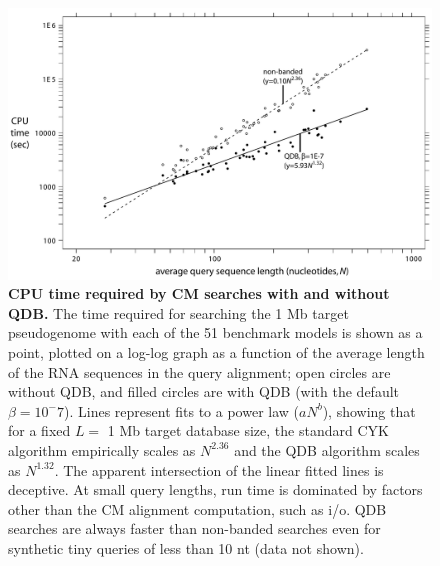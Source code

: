 \begin{figure}
\begin{center}
\includegraphics[width=6.4in]{figs/speedup}
\caption{\textbf{CPU time required by CM searches with and without
    QDB.} The time required for searching the 1 Mb target pseudogenome
    with each of the 51 benchmark models is shown as a point, plotted
    on a log-log graph as a function of the average length of the RNA
    sequences in the query alignment; open circles are without QDB,
    and filled circles are with QDB (with the default $\beta = 
    10^-7$). Lines represent fits to a power law ($aN^b$), showing that
    for a fixed $L=$ 1 Mb target database size, the standard CYK
    algorithm empirically scales as $N^{2.36}$ and the QDB algorithm
    scales as $N^{1.32}$. The apparent intersection of the linear
    fitted lines is deceptive. At small query lengths,
    run time is dominated by factors other than the CM alignment
    computation, such as i/o. QDB searches are always faster
    than non-banded searches even for synthetic tiny
    queries of less than 10 nt (data not shown).}
\label{fig:speedup}
\end{center}
\end{figure}


